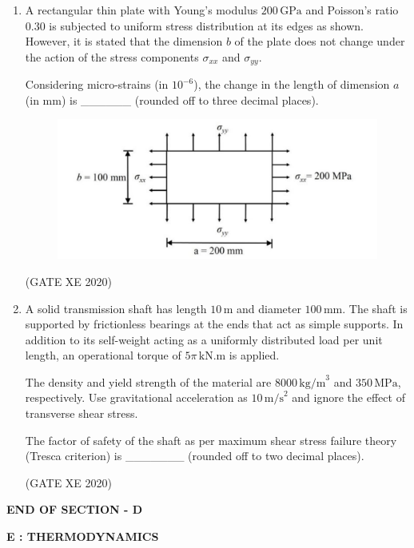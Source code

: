 \documentclass[12pt]{article}
\begin{document}
\begin{enumerate}
(GATE XE 2020)

\item A rectangular thin plate with Young's modulus $200 \,\text{GPa}$ and Poisson's ratio $0.30$ is subjected to uniform stress distribution at its edges as shown. However, it is stated that the dimension $b$ of the plate does not change under the action of the stress components $\sigma_{xx}$ and $\sigma_{yy}$.  

Considering micro-strains (in $10^{-6}$), the change in the length of dimension $a$ (in mm) is \_\_\_\_\_\_ (rounded off to three decimal places).  

\begin{figure}[H]
    \centering
    \includegraphics[width=0.5\columnwidth]{figs/ass4_d_q21.png}
    \caption{}
    \label{fig:placeholder}
\end{figure}
(GATE XE 2020)

\item A solid transmission shaft has length $10 \,\text{m}$ and diameter $100 \,\text{mm}$. The shaft is supported by frictionless bearings at the ends that act as simple supports. In addition to its self-weight acting as a uniformly distributed load per unit length, an operational torque of $5\pi \,\text{kN.m}$ is applied.  

The density and yield strength of the material are $8000 \,\text{kg/m}^3$ and $350 \,\text{MPa}$, respectively. Use gravitational acceleration as $10 \,\text{m/s}^2$ and ignore the effect of transverse shear stress.  

The factor of safety of the shaft as per maximum shear stress failure theory (Tresca criterion) is \_\_\_\_\_\_\_ (rounded off to two decimal places). 

(GATE XE 2020)

\end{enumerate}

\begin{center}
    \textbf{END OF SECTION - D}
\end{center}

\newpage
\begin{center}
    {\Large \textbf{E : THERMODYNAMICS} }
\end{center}
\end{document}
